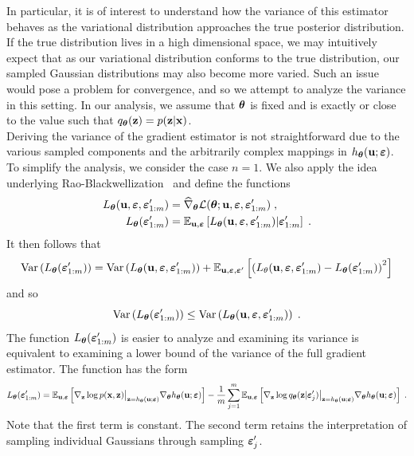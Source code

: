 \documentclass[10pt]{article}
\begin{document}
In particular, it is of interest to understand how the variance of this estimator behaves as the variational distribution approaches the true posterior distribution. If the true distribution lives in a high dimensional space, we may intuitively expect that as our variational distribution conforms to the true distribution, our sampled Gaussian distributions may also become more varied. Such an issue would pose a problem for convergence, and so we attempt to analyze the variance in this setting. In our analysis, we assume that ${\bm{\theta}}$ is fixed and is exactly or close to the value such that $q_{\bm{\theta}}(\mathbf{z})=p(\mathbf{z}|\mathbf{x})$.
\\

Deriving the variance of the gradient estimator is not straightforward due to the various sampled components and the arbitrarily complex mappings in $h_{\bm{\theta}}(\mathbf{u};\bm{\varepsilon})$. To simplify the analysis, we consider the case $n=1$. We also apply the idea underlying Rao-Blackwellization~\citep{Ranganath:2014} and define the functions
\begin{align*}
L_{\bm{\theta}}(\mathbf{u},\bm{\varepsilon},\bm{\varepsilon}_{1:m}') &= \widehat{\nabla}_{\bm{\theta}}\mathcal{L}({\bm{\theta}};\mathbf{u},\bm{\varepsilon},\bm{\varepsilon}_{1:m}') \;, \\
L_{\bm{\theta}}(\bm{\varepsilon}_{1:m}') &= \mathbb{E}_{\mathbf{u},\bm{\varepsilon}}\left[L_{\bm{\theta}}(\mathbf{u},\bm{\varepsilon},\bm{\varepsilon}_{1:m}')|\bm{\varepsilon}_{1:m}'\right] \;.
\end{align*}
It then follows that
\[
\mathrm{Var}\left(L_{\bm{\theta}}(\bm{\varepsilon}_{1:m}')\right) = \mathrm{Var}\left(L_{\bm{\theta}}(\mathbf{u},\bm{\varepsilon},\bm{\varepsilon}_{1:m}')\right) + \mathbb{E}_{\mathbf{u},\bm{\varepsilon},\bm{\varepsilon}'}\left[\left(L_\theta(\mathbf{u},\bm{\varepsilon},\bm{\varepsilon}_{1:m}')-L_{\bm{\theta}}(\bm{\varepsilon}_{1:m}')\right)^2\right]
\]
and so
\[
\mathrm{Var}\left(L_{\bm{\theta}}(\bm{\varepsilon}_{1:m}')\right) \leq \mathrm{Var}\left(L_{\bm{\theta}}(\mathbf{u},\bm{\varepsilon},\bm{\varepsilon}_{1:m}')\right) \;.
\]
The function $L_{\bm{\theta}}(\bm{\varepsilon}_{1:m}')$ is easier to analyze and examining its variance is equivalent to examining a lower bound of the variance of the full gradient estimator. The function has the form
\[
L_{\bm{\theta}}(\bm{\varepsilon}_{1:m}') = \mathbb{E}_{\mathbf{u},\bm{\varepsilon}}\left[\nabla_{\mathbf{z}}\log p(\mathbf{x},\mathbf{z})\big|_{\mathbf{z}=h_{\bm{\theta}}(\mathbf{u};\bm{\varepsilon})}\nabla_{\bm{\theta}} h_{\bm{\theta}}(\mathbf{u};\bm{\varepsilon})\right] - \frac{1}{m}\sum_{j=1}^m\mathbb{E}_{\mathbf{u},\bm{\varepsilon}}\left[\nabla_{\mathbf{z}}\log q_{\bm{\theta}}(\mathbf{z}|\bm{\varepsilon}_j')\big|_{\mathbf{z}=h_{\bm{\theta}}(\mathbf{u};\bm{\varepsilon})} \nabla_{\bm{\theta}} h_{\bm{\theta}}(\mathbf{u};\bm{\varepsilon})\right] \;.
\]
Note that the first term is constant. The second term retains the interpretation of sampling individual Gaussians through sampling $\bm{\varepsilon}_j'$.
\\
\end{document}
